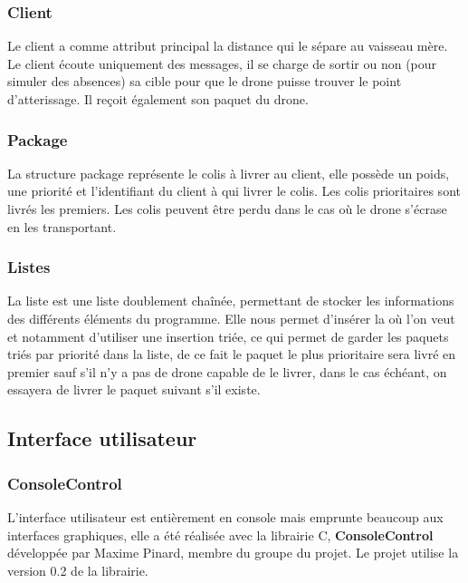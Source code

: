 \documentclass[article, backcover, french, nodocumentinfo]{upmethodology-document}
\begin{document}
			\subsubsection{Client}
			Le client a comme attribut principal la distance qui le sépare au vaisseau mère. Le client écoute uniquement des messages,
			il se charge de sortir ou non (pour simuler des absences) sa cible pour que le drone puisse trouver le point d'atterissage.
			Il reçoit également son paquet du drone.
			\subsubsection{Package}
			La structure package représente le colis à livrer au client, elle possède un poids, une priorité et l'identifiant du client à qui livrer le colis.
			Les colis prioritaires sont livrés les premiers. Les colis peuvent être perdu dans le cas où le drone s'écrase en les transportant.
			\subsubsection{Listes}
			La liste est une liste doublement chaînée, permettant de stocker les informations des différents éléments du programme.
			Elle nous permet d'insérer la où l'on veut et notamment d'utiliser une insertion triée, ce qui permet de garder les paquets
			triés par priorité dans la liste, de ce fait le paquet le plus prioritaire sera livré en premier sauf s'il n'y a pas de drone
			capable de le livrer, dans le cas échéant, on essayera de livrer le paquet suivant s'il existe.
		\subsection{Interface utilisateur}
			\subsubsection{ConsoleControl}
				L'interface utilisateur est entièrement en console mais emprunte beaucoup aux interfaces graphiques, elle a été réalisée avec la librairie C, \textbf{ConsoleControl} développée par Maxime Pinard, membre du groupe du projet. Le projet utilise la version 0.2 de la librairie.
\end{document}
